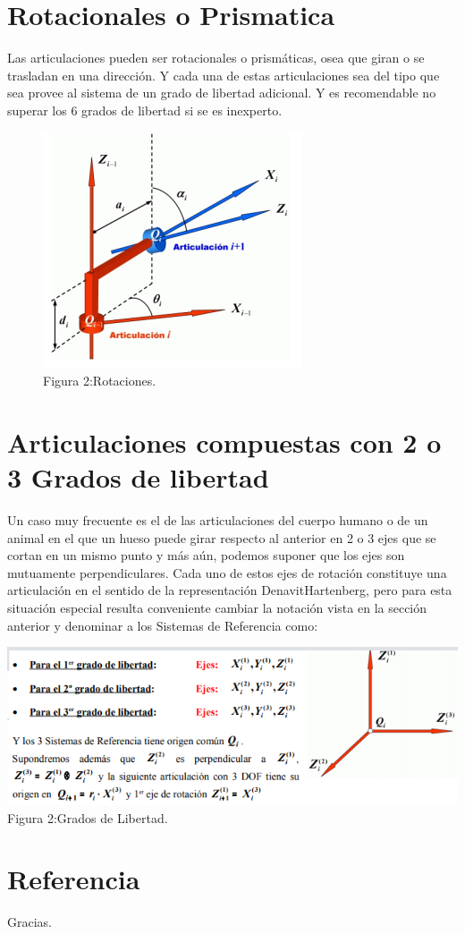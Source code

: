 \documentclass[12pt,a4paper]{report}
\begin{document}
\section{Rotacionales o Prismatica}
Las articulaciones pueden ser rotacionales o prismáticas, osea que giran o se trasladan en una dirección. Y cada una de estas articulaciones sea del tipo que sea provee al sistema de un grado de libertad adicional. Y es recomendable no superar los 6 grados de libertad si se es inexperto.\\


\begin{figure}
\centering
  \includegraphics[scale=.5]{Robot1.png}\\
    Figura 2:Rotaciones.
\end{figure}

\section{Articulaciones compuestas con 2 o 3 Grados de libertad}
Un caso muy frecuente es el de las articulaciones del cuerpo humano o de un animal en el que un hueso
puede girar respecto al anterior en 2 o 3 ejes que se cortan en un mismo punto y más aún, podemos suponer
que los ejes son mutuamente perpendiculares.
Cada uno de estos ejes de rotación constituye una articulación en el sentido de la representación DenavitHartenberg, pero para esta situación especial resulta conveniente cambiar la notación vista en la sección
anterior y denominar a los Sistemas de Referencia como:


\centering
  \includegraphics[scale=.5]{Robot2.png}\\
    Figura 2:Grados de Libertad.


\section{Referencia}


\cite{del2011representacion}







\begin{center}
Gracias.
\end{center}
\end{document}
